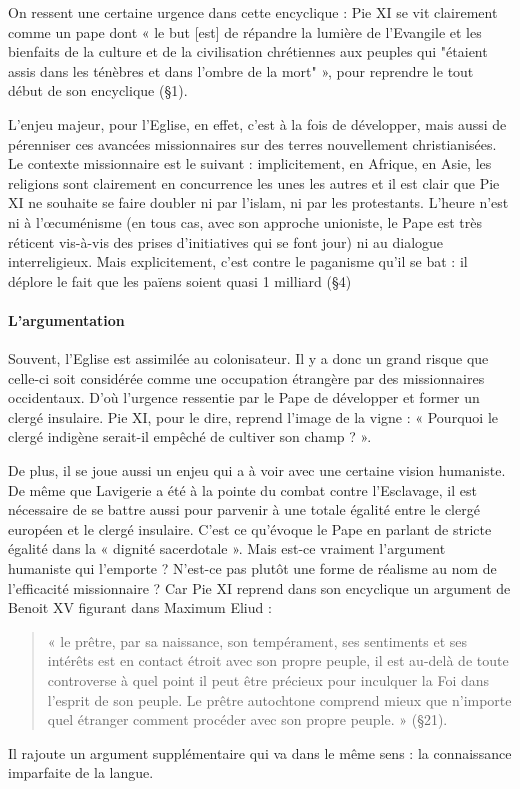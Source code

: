On ressent une certaine urgence dans cette encyclique : Pie XI se vit clairement comme un pape dont « le but [est] de répandre la lumière de l’Evangile et les bienfaits de la culture et de la civilisation chrétiennes aux peuples qui "étaient assis dans les ténèbres et dans l’ombre de la mort" », pour reprendre le tout début de son encyclique (§1).  


L’enjeu majeur, pour l’Eglise, en effet, c’est à la fois de développer, mais aussi de pérenniser ces avancées missionnaires sur des terres nouvellement christianisées. 
Le contexte missionnaire est le suivant : implicitement, en Afrique, en Asie,  les religions sont clairement en concurrence les unes les autres et il est clair que Pie XI ne souhaite se faire doubler ni par l’islam, ni par les protestants. L’heure n’est ni à l’œcuménisme (en tous cas, avec son approche unioniste, le Pape est très réticent vis-à-vis des prises d’initiatives qui se font jour) ni au dialogue interreligieux. Mais explicitement, c’est contre le paganisme qu’il se bat : il déplore le fait que les païens soient quasi 1 milliard (§4)

\paragraph{L’argumentation }
 

Souvent, l’Eglise est assimilée au colonisateur. Il y a donc un grand risque que celle-ci soit considérée comme une occupation étrangère par des missionnaires occidentaux. D’où l’urgence ressentie par le Pape de développer et former un clergé insulaire. Pie XI, pour le dire, reprend l’image de la vigne : « Pourquoi le clergé indigène serait-il empêché de cultiver son champ ? ». 

De plus, il se joue aussi un enjeu qui a à voir avec une certaine vision humaniste. De même que Lavigerie a été à la pointe du combat contre l’Esclavage, il est nécessaire de se battre aussi pour parvenir à une totale égalité entre le clergé européen et le clergé insulaire. C’est ce qu’évoque le Pape en parlant de stricte égalité dans la « dignité sacerdotale ».  Mais est-ce vraiment l’argument humaniste qui l'emporte ? N'est-ce pas plutôt une forme de réalisme au nom de l’efficacité missionnaire ? 
Car Pie XI reprend dans son encyclique un argument de Benoit XV figurant dans Maximum Eliud : 

\begin{quote}
    « le prêtre, par sa naissance, son tempérament, ses sentiments et ses intérêts est en contact étroit avec son propre peuple, il est au-delà de toute controverse à quel point il peut être précieux pour inculquer la Foi dans l’esprit de son peuple. Le prêtre autochtone comprend mieux que n’importe quel étranger comment procéder avec son propre peuple. » (§21). 
\end{quote}
Il rajoute un argument supplémentaire qui va dans le même sens : la connaissance imparfaite de la langue.

